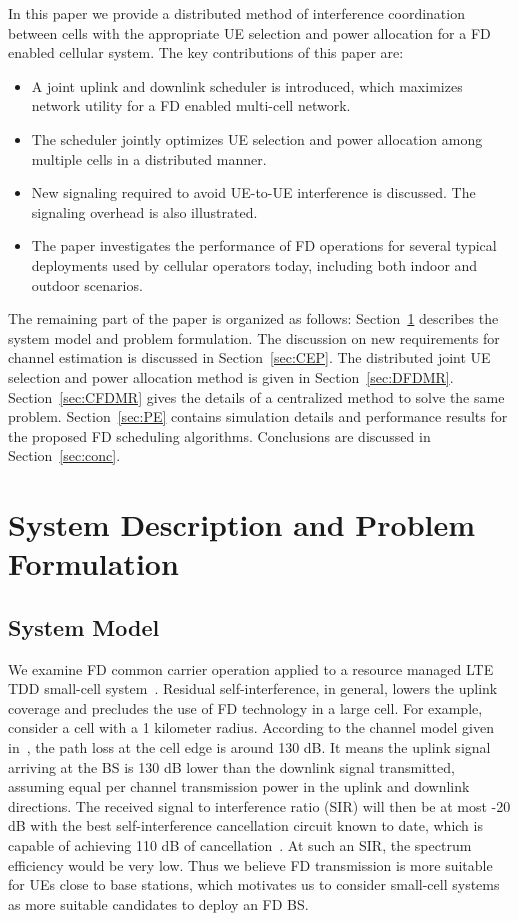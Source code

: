 \documentclass[journal]{IEEEtran}
\begin{document}
In this paper we provide a distributed method of interference coordination between cells with the appropriate UE selection and power allocation for a FD enabled cellular system. The key contributions of this paper are:
\begin{itemize}
\item A joint uplink and downlink scheduler is introduced, which maximizes network utility for a FD enabled multi-cell network.
\item The scheduler jointly optimizes UE selection and power allocation among multiple cells in a distributed manner.  
\item New signaling required to avoid UE-to-UE interference is discussed. The signaling overhead is also illustrated.
\item The paper investigates the performance of FD operations for several typical deployments used by cellular operators today, including both indoor and outdoor scenarios.
\end{itemize}

The remaining part of the paper is organized as follows: Section~\ref{sec:SMPF} describes the system model and problem formulation. The discussion on new requirements for channel estimation is discussed in Section~\ref{sec:CEP}. The distributed joint UE selection and power allocation method is given in Section~\ref{sec:DFDMR}. Section~\ref{sec:CFDMR} gives the details of a centralized method to solve the same problem. Section~\ref{sec:PE} contains simulation details and performance results for the proposed FD scheduling algorithms. Conclusions are discussed in Section~\ref{sec:conc}.

\section{System Description and Problem Formulation}\label{sec:SMPF}

\subsection{System Model}\label{subsec:SMPFS1}
We examine FD common carrier operation applied to a resource managed LTE TDD small-cell system~\cite{DahlmanLTE, 3GPP:2}. Residual self-interference, in general, lowers the uplink coverage and precludes the use of FD technology in a large cell. For example, consider a cell with a 1 kilometer radius. According to the channel model given in~\cite{3GPP:1}, the path loss at the cell edge is around 130 dB. It means the uplink signal arriving at the BS is 130 dB lower than the downlink signal transmitted, assuming equal per channel transmission power in the uplink and downlink directions. The received signal to interference ratio (SIR) will then be at most -20 dB with the best self-interference cancellation circuit known to date, which is capable of achieving 110 dB of cancellation~\cite{Katti13}. At such an SIR, the spectrum efficiency would be very low. Thus we believe FD transmission is more suitable for UEs close to base stations, which motivates us to consider small-cell systems as more suitable candidates to deploy an FD BS. 
\end{document}
